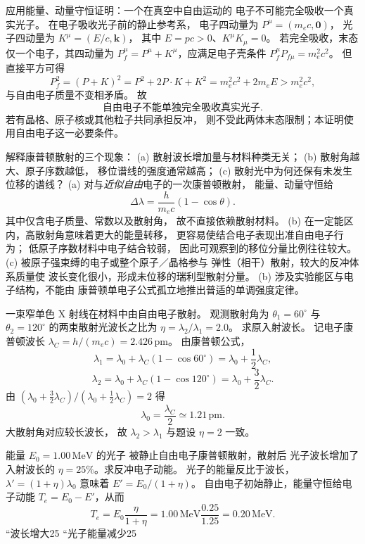 应用能量、动量守恒证明：一个在真空中自由运动的
电子不可能完全吸收一个真实光子。
\exsolution
在电子吸收光子前的静止参考系，
电子四动量为 $P^\mu=(m_ec,\boldsymbol0)$，
光子四动量为 $K^\mu=(E/c,\boldsymbol k)$，
其中 $E=pc>0$、$K^\mu K_\mu=0$。
若完全吸收，末态仅一个电子，其四动量为
$P_f^\mu=P^\mu+K^\mu$，应满足电子壳条件
$P_f^\mu P_{f\mu}=m_e^2c^2$。
但直接平方可得
\[
 P_f^2=(P+K)^2=P^2+2P\!\cdot\! K+K^2
 =m_e^2c^2+2m_eE>m_e^2c^2,
\]
与自由电子质量不变相矛盾。
故
\[
 \boxed{\text{自由电子不能单独完全吸收真实光子}}.
\]
\excheck 若有晶格、原子核或其他粒子共同承担反冲，
则不受此两体末态限制；本证明使用自由电子这一必要条件。

解释康普顿散射的三个现象：
(a) 散射波长增加量与材料种类无关；
(b) 散射角越大、原子序数越低，
移位谱线的强度通常越高；
(c) 散射光中为何还保有未发生位移的谱线？
\exsolution
(a) 对与\emph{近似自由}电子的一次康普顿散射，
能量、动量守恒给
\[
 \boxed{\Delta\lambda=
 \frac{h}{m_ec}(1-\cos\theta)}.
\]
其中仅含电子质量、常数以及散射角，
故不直接依赖散射材料。
(b) 在一定能区内，高散射角意味着更大的能量转移，
更容易使结合电子表现出准自由电子行为；
低原子序数材料中电子结合较弱，
因此可观察到的移位分量比例往往较大。
(c) 被原子强束缚的电子或整个原子／晶格参与
弹性（相干）散射，较大的反冲体系质量使
波长变化很小，形成未位移的瑞利型散射分量。
\excheck (b) 涉及实验能区与电子结构，不能由
康普顿单电子公式孤立地推出普适的单调强度定律。

一束窄单色 X 射线在材料中由自由电子散射。
观测散射角为
$\theta_1=60^\circ$ 与 $\theta_2=120^\circ$
的两束散射光波长之比为
$\eta=\lambda_2/\lambda_1=2.0$。
求原入射波长。
\exsolution
记电子康普顿波长
$\lambda_C=h/(m_ec)=2.426\,\mathrm{pm}$。
由康普顿公式，
\[
 \lambda_1=\lambda_0+\lambda_C(1-\cos60^\circ)
 =\lambda_0+\frac12\lambda_C,
\]
\[
 \lambda_2=\lambda_0+\lambda_C(1-\cos120^\circ)
 =\lambda_0+\frac32\lambda_C.
\]
由
$(\lambda_0+\tfrac32\lambda_C)/
(\lambda_0+\tfrac12\lambda_C)=2$
得
\[
 \boxed{\lambda_0=\frac{\lambda_C}{2}
 \simeq1.21\,\mathrm{pm}}.
\]
\excheck 大散射角对应较长波长，
故 $\lambda_2>\lambda_1$ 与题设 $\eta=2$ 一致。

能量 $E_0=1.00\,\mathrm{MeV}$ 的光子
被静止自由电子康普顿散射，散射后
光子波长增加了入射波长的
$\eta=25\%$。求反冲电子动能。
\exsolution
光子的能量反比于波长，
$\lambda'=(1+\eta)\lambda_0$ 意味着
$E'=E_0/(1+\eta)$。
自由电子初始静止，能量守恒给电子动能
$T_e=E_0-E'$，从而
\[
 \boxed{T_e=E_0\frac{\eta}{1+\eta}
 =1.00\,\mathrm{MeV}\frac{0.25}{1.25}
 =0.20\,\mathrm{MeV}}.
\]
\excheck “波长增大25%
“光子能量减少25%


